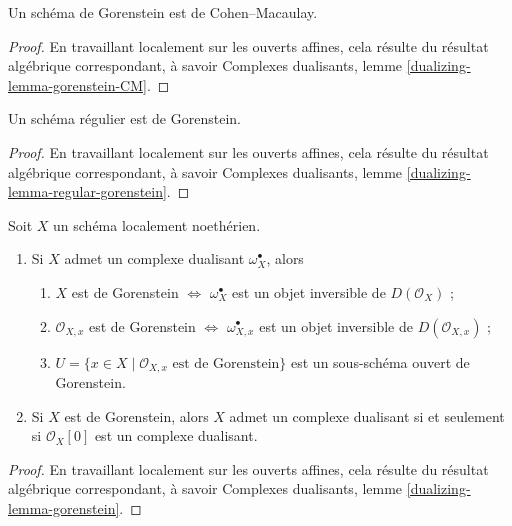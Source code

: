 \begin{lemma}
\label{lemma-gorenstein-CM}
Un schéma de Gorenstein est de Cohen–Macaulay.
\end{lemma}

\begin{proof}
En travaillant localement sur les ouverts affines, cela résulte du résultat algébrique correspondant, à savoir Complexes dualisants, lemme \ref{dualizing-lemma-gorenstein-CM}.
\end{proof}

\begin{lemma}
\label{lemma-regular-gorenstein}
Un schéma régulier est de Gorenstein.
\end{lemma}

\begin{proof}
En travaillant localement sur les ouverts affines, cela résulte du résultat algébrique correspondant, à savoir Complexes dualisants, lemme \ref{dualizing-lemma-regular-gorenstein}.
\end{proof}

\begin{lemma}
\label{lemma-gorenstein}
Soit $X$ un schéma localement noethérien.
\begin{enumerate}
\item Si $X$ admet un complexe dualisant $\omega_X^\bullet$, alors
\begin{enumerate}
\item $X$ est de Gorenstein $\Leftrightarrow$ $\omega_X^\bullet$ est un objet inversible de $D(\mathcal{O}_X)$ ;
\item $\mathcal{O}_{X, x}$ est de Gorenstein $\Leftrightarrow$ $\omega_{X, x}^\bullet$ est un objet inversible de $D(\mathcal{O}_{X, x})$ ;
\item $U = \{x \in X \mid \mathcal{O}_{X, x}\text{ est de Gorenstein}\}$ est un sous-schéma ouvert de Gorenstein.
\end{enumerate}
\item Si $X$ est de Gorenstein, alors $X$ admet un complexe dualisant si et seulement si $\mathcal{O}_X[0]$ est un complexe dualisant.
\end{enumerate}
\end{lemma}

\begin{proof}
En travaillant localement sur les ouverts affines, cela résulte du résultat algébrique correspondant, à savoir Complexes dualisants, lemme \ref{dualizing-lemma-gorenstein}.
\end{proof}


